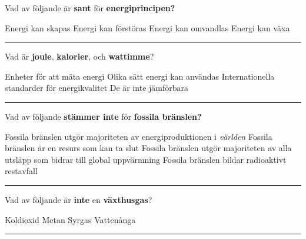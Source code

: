\documentclass{exam}
\begin{document}
\vspace{5mm} %
\begin{center}
\end{center}
\vspace{5mm} %

\begin{questions}

\question Vad av följande är \textbf{sant} för \textbf{energiprincipen?}
\begin{checkboxes}
   \choice Energi kan skapas
   \choice Energi kan förstöras
   \choice Energi kan omvandlas
   \choice Energi kan växa
\end{checkboxes}

\vspace{5mm} 
\hrule 
\vspace{5mm} 

\question Vad är \textbf{joule}, \textbf{kalorier}, och \textbf{wattimme}?
\begin{checkboxes}
   \choice Enheter för att mäta energi
   \choice Olika sätt energi kan användas
   \choice Internationella standarder för energikvalitet
   \choice De är inte jämförbara
\end{checkboxes}

\vspace{5mm} 
\hrule 
\vspace{5mm} 

\question Vad av följande \textbf{stämmer inte} för \textbf{fossila bränslen?}
\begin{checkboxes}
   \choice Fossila bränslen utgör majoriteten av energiproduktionen i \textit{världen}
   \choice Fossila bränslen är en resurs som kan ta slut
   \choice Fossila bränslen utgör majoriteten av alla utsläpp som bidrar till global uppvärmning
   \choice Fossila bränslen bildar radioaktivt restavfall
\end{checkboxes}

\vspace{5mm} 
\hrule 
\vspace{5mm} 

\question Vad av följande är \textbf{inte} en \textbf{växthusgas}?
\begin{checkboxes}
   \choice Koldioxid
   \choice Metan
   \choice Syrgas
   \choice Vattenånga
\end{checkboxes}
\vspace{5mm} 
\hrule 
\vspace{5mm} 


\end{questions}
\end{document}
